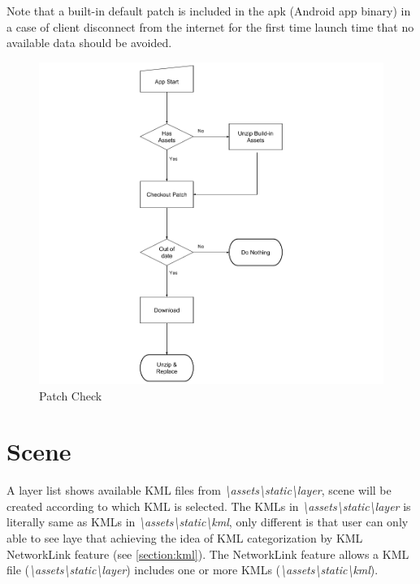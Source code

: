 Note that a built-in default patch is included in the apk (Android app binary) in a case of client disconnect from the internet for the first time launch time that no available data should be avoided.

\begin{figure}[H]
\caption[patch-check]{Patch Check}
\label{fig:patch-check}
\centering
\includegraphics[width=\linewidth]{Figures/patch-check.png}
\decoRule
\end{figure}

\section{Scene}
\label{section:scene}

A layer list shows available KML files from \emph{\textbackslash assets\textbackslash static\textbackslash layer}, scene will be created according to which KML is selected. The KMLs in \emph{\textbackslash assets\textbackslash static\textbackslash layer} is literally same as KMLs in \emph{\textbackslash assets\textbackslash static\textbackslash kml}, only different is that user can only able to see laye that achieving the idea of KML categorization by KML NetworkLink feature (see \ref{section:kml}). The NetworkLink feature allows a KML file (\emph{\textbackslash assets\textbackslash static\textbackslash layer}) includes one or more KMLs (\emph{\textbackslash assets\textbackslash static\textbackslash kml}).

